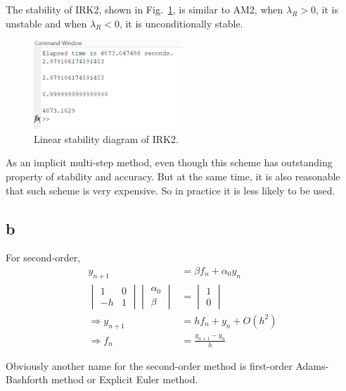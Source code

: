 \documentclass[letterpaper,10pt]{article}
\begin{document}
The stability of IRK2, shown in Fig.~\ref{fig3_1}, is similar to AM2, when $\lambda_R>0$, it is unstable and when $\lambda_R<0$, it is unconditionally stable. 
\begin{figure}[h]
  \centering
  \includegraphics[width=0.5\textwidth]{p3_1.png}
  \caption{Linear stability diagram of IRK2. }
  \label{fig3_1}
\end{figure}

As an implicit multi-step method, even though this scheme has outstanding property of stability and accuracy. But at the same time, 
it is also reasonable that such scheme is very expensive. So in practice it is less likely to be used. 
\subsection{b}
For second-order, 
\begin{align*}
  y_{n+1}&=\beta f_n+\alpha_0 y_n \\
  \begin{vmatrix}
    1&0\\-h&1
  \end{vmatrix}\begin{vmatrix}
    \alpha_0\\\beta
  \end{vmatrix}&=\begin{vmatrix}
    1\\0
  \end{vmatrix}\\
  \Rightarrow y_{n+1}&=h f_n + y_{n}+O(h^2)\\
  \Rightarrow f_n &= \frac{y_{n+1}-y_{n}}{h}
\end{align*}

Obviously another name for the second-order method is first-order Adams-Bashforth method or Explicit Euler method. 
\end{document}
